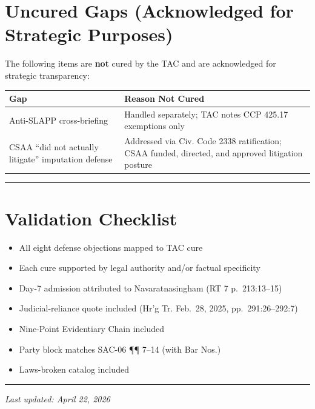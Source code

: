 \section{Uncured Gaps (Acknowledged for Strategic Purposes)}\label{uncured-gaps-acknowledged-for-strategic-purposes}

The following items are \textbf{not} cured by the TAC and are acknowledged for strategic transparency:

{\def\LTcaptype{table} %
\begin{longtable}[]{@{}
  >{\raggedright\arraybackslash}p{}
  >{\raggedright\arraybackslash}p{}@{}}
\toprule\noalign{}
\begin{minipage}[b]{\linewidth}\raggedright
Gap
\end{minipage} & \begin{minipage}[b]{\linewidth}\raggedright
Reason Not Cured
\end{minipage} \\
\midrule\noalign{}
\endhead
\bottomrule\noalign{}
\endlastfoot
Anti-SLAPP cross-briefing & Handled separately; TAC notes CCP \textsection{} 425.17 exemptions only \\
CSAA ``did not actually litigate'' imputation defense & Addressed via Civ. Code \textsection{} 2338 ratification; CSAA funded, directed, and approved litigation posture \\
\end{longtable}
}

\begin{center}\rule{0.5\linewidth}{0.5pt}\end{center}

\section{Validation Checklist}\label{validation-checklist}

\begin{itemize}
\tightlist
\item[$\boxtimes$]
  All eight defense objections mapped to TAC cure
\item[$\boxtimes$]
  Each cure supported by legal authority and/or factual specificity
\item[$\boxtimes$]
  Day-7 admission attributed to Navaratnasingham (RT 7 p.~213:13--15)
\item[$\boxtimes$]
  Judicial-reliance quote included (Hr'g Tr. Feb.~28, 2025, pp.~291:26--292:7)
\item[$\boxtimes$]
  Nine-Point Evidentiary Chain included
\item[$\boxtimes$]
  Party block matches SAC-06 ¶¶ 7--14 (with Bar Nos.)
\item[$\boxtimes$]
  Laws-broken catalog included
\end{itemize}

\begin{center}\rule{0.5\linewidth}{0.5pt}\end{center}

\emph{Last updated: April 22, 2026}

\nolinenumbers



